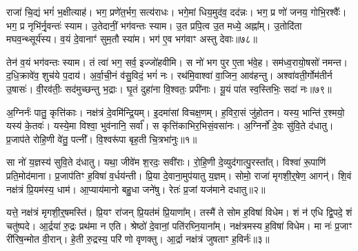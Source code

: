 राजा॑ चि॒द्यं भगं॑ भ॒क्षीत्याह॑।
भग॒ प्रणे॑त॒र्भग॒ सत्य॑राधः।
भगे॒मां धिय॒मुद॑व॒ दद॑न्नः।
भग॒ प्र णो॑ जनय॒ गोभि॒रश्वैः᳚।
भग॒ प्र नृभि॑र्नृ॒वन्तः॑ स्याम।
उ॒तेदानीं॒ भग॑वन्तः स्याम।
उ॒त प्रपि॒त्व उ॒त मध्ये॒ अह्ना᳚म्।
उ॒तोदि॑ता मघव॒न्थ्सूर्य॑स्य।
व॒यं दे॒वानाꣳ॑ सुम॒तौ स्या॑म।
भग॑ ए॒व भग॑वाꣳ अस्तु देवाः॥७८॥

तेन॑ व॒यं भग॑वन्तः स्याम।
तं त्वा॑ भग॒ सर्व॒ इज्जो॑हवीमि।
स नो॑ भग पुर ए॒ता भ॑वे॒ह।
सम॑ध्व॒रायो॒षसो॑ नमन्त।
द॒धि॒क्रावे॑व॒ शुच॑ये प॒दाय॑।
अ॒र्वा॒ची॒नं व॑सु॒विदं॒ भगं॑ नः।
रथ॑मि॒वाश्वा॑ वा॒जिन॒ आव॑हन्तु।
अश्वा॑वती॒र्गोम॑तीर्न उ॒षासः॑।
वी॒रव॑तीः॒ सद॑मुच्छन्तु भ॒द्राः।
घृ॒तं दुहा॑ना वि॒श्वतः॒ प्रपी॑नाः।
यू॒यं पा॑त स्व॒स्तिभिः॒ सदा॑ नः॥७९॥\anuvakamend[वि॒च॒क्ष॒णा वि॑चर्तु॒रꣳ शर्म॒न्नधि॑ वि॒सर्ज॑नाय॒ ब्रह्म॒ वनं॒ ब्रह्म॒ स वृ॒क्ष आ॑सीत्तु॒रश्चि॑द्देवाः॒ प्रपी॑ना॒ एकं॑ च]
\clearpage

\setcounter{anuvakam}{0}

अ॒ग्निर्नः॑ पातु॒ कृत्ति॑काः।
नक्ष॑त्रं दे॒वमि॑न्द्रि॒यम्।
इ॒दमा॑सां विचक्ष॒णम्।
ह॒विरा॒सं जु॑होतन।
यस्य॒ भान्ति॑ र॒श्मयो॒ यस्य॑ के॒तवः॑।
यस्ये॒मा विश्वा॒ भुव॑नानि॒ सर्वा᳚।
स कृत्ति॑काभि\-र॒भिसं॒वसा॑नः।
अ॒ग्निर्नो॑ दे॒वः सु॑वि॒ते द॑धातु।
प्र॒जा\-प॑ते रोहि॒णी वे॑तु॒ पत्नी᳚।
वि॒श्वरू॑पा बृह॒ती चि॒त्रभा॑नुः॥१॥

सा नो॑ य॒ज्ञस्य॑ सुवि॒ते द॑धातु।
यथा॒ जीवे॑म श॒रदः॒ सवी॑राः।
रो॒हि॒णी दे॒व्युद॑गात्पु॒रस्ता᳚त्।
विश्वा॑ रू॒पाणि॑ प्रति॒मोद॑माना।
प्र॒जा\-प॑तिꣳ ह॒विषा॑ व॒र्धय॑न्ती।
प्रि॒या दे॒वाना॒मुप॑यातु य॒ज्ञम्।
सोमो॒ राजा॑ मृगशी॒र्॒‌षेण॒ आगन्॑।
शि॒वं नक्ष॑त्रं प्रि॒यम॑स्य॒ धाम॑।
आ॒प्याय॑मानो बहु॒धा जने॑षु।
रेतः॑ प्र॒जां यज॑माने दधातु॥२॥

यत्ते॒ नक्ष॑त्रं मृगशी॒र्॒‌षमस्ति॑।
प्रि॒यꣳ रा॑जन् प्रि॒यत॑मं प्रि॒याणा᳚म्।
तस्मै॑ ते सोम ह॒विषा॑ विधेम।
शं न॑ एधि द्वि॒पदे॒ शं चतु॑ष्पदे।
आ॒र्द्रया॑ रु॒द्रः प्रथ॑मा न एति।
श्रेष्ठो॑ दे॒वानां॒ पति॑रघ्नि॒याना᳚म्।
नक्ष॑त्रमस्य ह॒विषा॑ विधेम।
मा नः॑ प्र॒जाꣳ री॑रिष॒न्मोत वी॒रान्।
हे॒ती रु॒द्रस्य॒ परि॑ णो वृणक्तु।
आ॒र्द्रा नक्ष॑त्रं जुषताꣳ ह॒विर्नः॑॥३॥

